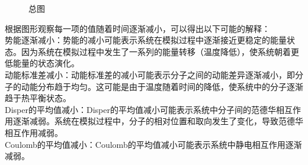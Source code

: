 \documentclass[12pt, a4paper, oneside]{ctexart}
\begin{document}
\begin{spacing}{2.0}
\begin{figure}[H]
\begin{minipage}[t]{0.5\linewidth}
      \caption{总图}
      \label{fig:side:b}
    \end{minipage}
\end{figure}
根据图形观察每一项的值随着时间逐渐减小，可以得出以下可能的解释：
\\
势能逐渐减小：势能的减小可能表示系统在模拟过程中逐渐接近更稳定的能量状态。因为系统在模拟过程中发生了一系列的能量转移（温度降低），使系统朝着更低能量的状态演化。
\\
动能标准差减小：动能标准差的减小可能表示分子之间的动能差异逐渐减小，即分子的动能分布趋于均匀。这可能是由于温度随着时间的降低，使系统中的分子逐渐趋于热平衡状态。
\\
Disper的平均值减小：Disper的平均值减小可能表示系统中分子间的范德华相互作用逐渐减弱。系统在模拟过程中，分子的相对位置和取向发生了变化，导致范德华相互作用减弱。
\\
Coulomb的平均值减小：Coulomb的平均值减小可能表示系统中静电相互作用逐渐减弱。
\end{spacing}{}


\end{document}
